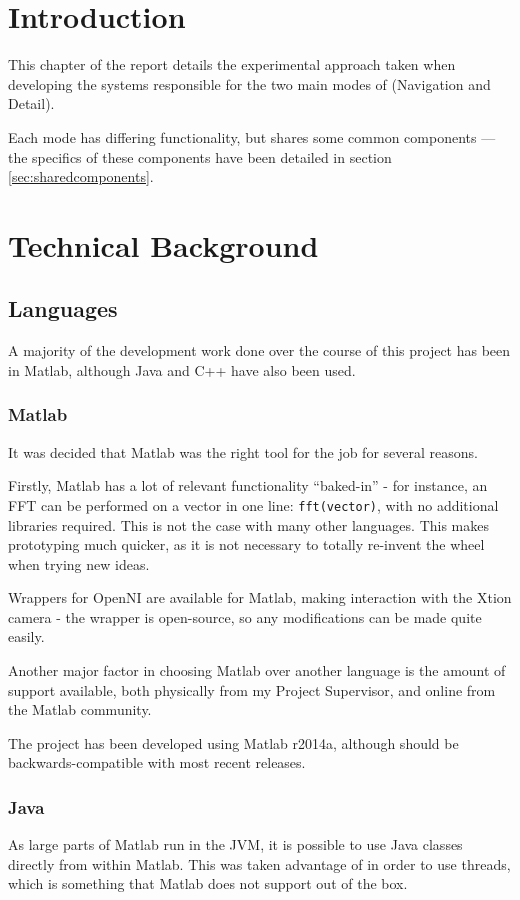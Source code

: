 \section{Introduction}
This chapter of the report details the experimental approach taken when developing the systems responsible for the two main modes of (Navigation and Detail).

Each mode has differing functionality, but shares some common components --- the specifics of these components have been detailed in section \ref{sec:sharedcomponents}.   

\section{Technical Background}
\subsection{Languages}
A majority of the development work done over the course of this project has been in Matlab, although Java and C++ have also been used.

\subsubsection{Matlab}
It was decided that Matlab was the right tool for the job for several reasons.

Firstly, Matlab has a lot of relevant functionality ``baked-in'' - for instance, an \ac{FFT} can be performed on a vector in one line: \lstinline$fft(vector)$, with no additional libraries required. This is not the case with many other languages. This makes prototyping much quicker, as it is not necessary to totally re-invent the wheel when trying new ideas.

Wrappers for OpenNI are available for Matlab, making interaction with the Xtion camera - the wrapper is open-source, so any modifications can be made quite easily.

Another major factor in choosing Matlab over another language is the amount of support available, both physically from my Project Supervisor, and online from the Matlab community. 

The project has been developed using Matlab r2014a, although should be backwards-compatible with most recent releases. 

\subsubsection{Java}
As large parts of Matlab run in the \ac{JVM}, it is possible to use Java classes directly from within Matlab. This was taken advantage of in order to use threads, which is something that Matlab does not support out of the box. 

